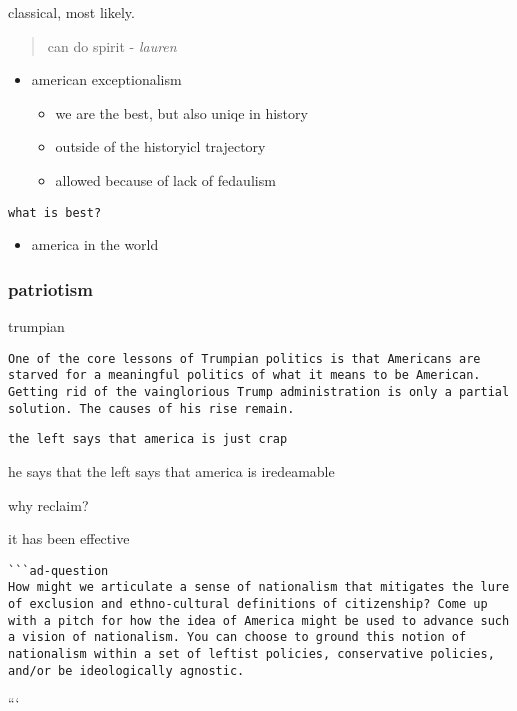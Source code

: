 \documentclass[letterpaper]{article}
\begin{document}
classical, most likely.

\begin{quote}
can do spirit - \emph{lauren}
\end{quote}

\begin{itemize}
\item american exceptionalism

\begin{itemize}
\item we are the best, but also uniqe in history
\item outside of the historyicl trajectory
\item allowed because of lack of fedaulism
\end{itemize}
\end{itemize}

\begin{verbatim}
what is best?
\end{verbatim}

\begin{itemize}
\item america in the world
\end{itemize}

\subsubsection{patriotism}
\label{sec:orge7eeea1}
trumpian

\begin{verbatim}
One of the core lessons of Trumpian politics is that Americans are starved for a meaningful politics of what it means to be American. Getting rid of the vainglorious Trump administration is only a partial solution. The causes of his rise remain.
\end{verbatim}

\begin{verbatim}
the left says that america is just crap
\end{verbatim}

he says that the left says that america is iredeamable

why reclaim?

it has been effective

\begin{verbatim}
```ad-question
How might we articulate a sense of nationalism that mitigates the lure of exclusion and ethno-cultural definitions of citizenship? Come up with a pitch for how the idea of America might be used to advance such a vision of nationalism. You can choose to ground this notion of nationalism within a set of leftist policies, conservative policies, and/or be ideologically agnostic.
\end{verbatim}

```
\end{document}
